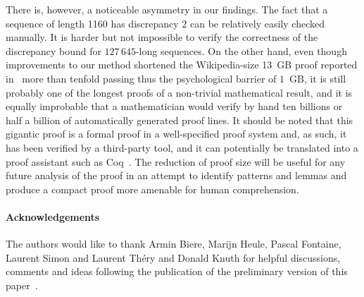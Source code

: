 \documentclass{article} \usepackage[utf8]{inputenc}
\begin{document}
There is, however, a noticeable asymmetry in our findings.  The fact that a
sequence of length 1160 has discrepancy $2$ can be relatively easily checked
manually.  It is harder but not impossible to verify the correctness of the
discrepancy bound for $127\, 645$-long sequences.
On the other hand, even though improvements to our method shortened the
Wikipedia-size 13~GB proof reported in~\cite{KLArx14} 
more than 
tenfold passing
thus the psychological barrier of $1$~GB, it is still probably one of the
longest proofs of a non-trivial  mathematical result, and it is equally
improbable that a mathematician would verify by hand ten billions or half a
billion of automatically generated proof lines. 
It should be noted that this gigantic proof is a formal 
proof in a well-specified proof system and, as such, it has been verified by 
a third-party tool, and it can potentially be translated into a proof assistant such as Coq~\cite{coq}.
The reduction of proof size
will be useful for any future analysis of the proof in an attempt to
identify patterns and lemmas and produce a compact proof more amenable for
human comprehension. 

\paragraph{Acknowledgements}
The authors would like to thank
Armin Biere,
Marijn Heule,
Pascal Fontaine,
Laurent Simon and
Laurent Th\'ery
and Donald Knuth
for helpful  discussions, comments and ideas following the publication of the
preliminary version of this paper~\cite{KLArx14}.  
\end{document}
